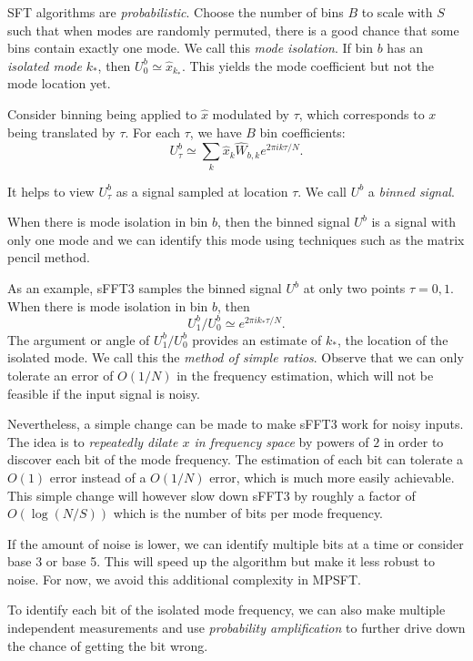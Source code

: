 \documentclass[10pt]{article}
\begin{document}
SFT algorithms are \emph{probabilistic}. Choose the number of bins $B$ to scale with $S$ such that when modes are randomly permuted, there is a good chance that some bins contain exactly one mode. We call this \emph{mode isolation}. If bin $b$ has an \emph{isolated mode} $k_*$, then $U^b_0 \simeq \hat{x}_{k_*}$. This yields the mode coefficient but not the mode location yet.

Consider binning being applied to $\hat{x}$ modulated by $\tau$, which corresponds to $x$ being translated by $\tau$. For each $\tau$, we have $B$ bin coefficients:
$$U^b_{\tau} \simeq \sum_k \hat{x}_k \hat{W}_{b,k} e^{2\pi i k \tau/N}.$$

It helps to view $U^b_{\tau}$ as a signal sampled at location $\tau$. We call $U^b$ a \emph{binned signal}.

When there is mode isolation in bin $b$, then the binned signal $U^b$ is a signal with only one mode and we can identify this mode using techniques such as the matrix pencil method.

As an example, sFFT3 samples the binned signal $U^b$ at only two points $\tau=0,1$. When there is mode isolation in bin $b$, then
$$U^b_1/U^b_0 \simeq e^{2\pi i k_*\tau/N}.$$
The argument or angle of $U_1^b/U^b_0$ provides an estimate of $k_*$, the location of the isolated mode. We call this the \emph{method of simple ratios}. Observe that we can only tolerate an error of $O(1/N)$ in the frequency estimation, which will not be feasible if the input signal is noisy.

Nevertheless, a simple change can be made to make sFFT3 work for noisy inputs. The idea is to \emph{repeatedly dilate $x$ in frequency space} by powers of $2$ in order to discover each bit of the mode frequency. The estimation of each bit can tolerate a $O(1)$ error instead of a $O(1/N)$ error, which is much more easily achievable. This simple change will however slow down sFFT3 by roughly a factor of $O(\log (N/S))$ which is the number of bits per mode frequency.

If the amount of noise is lower, we can identify multiple bits at a time or consider base 3 or base 5. This will speed up the algorithm but make it less robust to noise. For now, we avoid this additional complexity in MPSFT.

To identify each bit of the isolated mode frequency, we can also make multiple independent measurements and use \emph{probability amplification} to further drive down the chance of getting the bit wrong.
\end{document}
